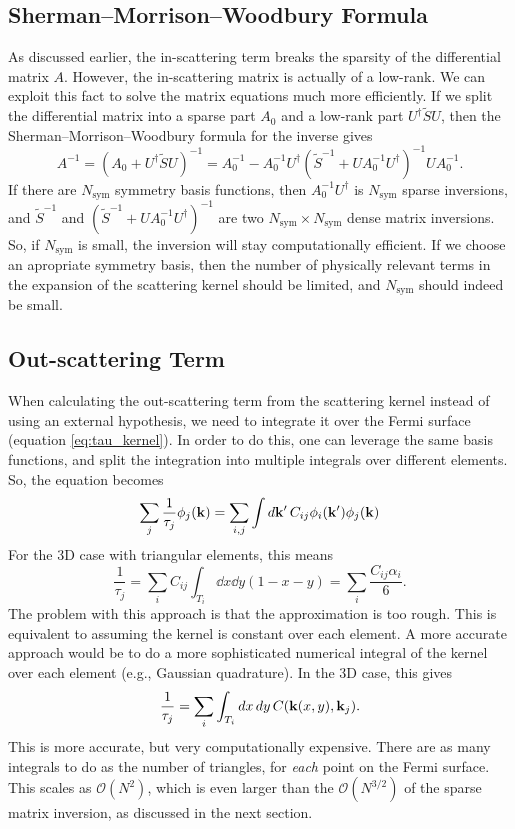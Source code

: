 \documentclass[12pt]{article}
\begin{document}
\subsection{Sherman--Morrison--Woodbury Formula}
As discussed earlier, the in-scattering term breaks the sparsity of the differential matrix $A$.
However, the in-scattering matrix is actually of a low-rank. We can exploit this fact to solve
the matrix equations much more efficiently. If we split the differential matrix into a sparse
part $A_0$ and a low-rank part $U^\dagger \tilde{S} U$, then the Sherman--Morrison--Woodbury
formula for the inverse gives
\begin{equation}
    A^{-1} = (A_0 + U^\dagger \tilde{S} U)^{-1}
    = A_0^{-1} - A_0^{-1} U^\dagger (\tilde{S}^{-1} + U A_0^{-1} U^\dagger)^{-1} U A_0^{-1}.
\end{equation}
If there are $N_{\text{sym}}$ symmetry basis functions, then $A_0^{-1} U^{\dagger}$ is
$N_{\text{sym}}$ sparse inversions, and $\tilde{S}^{-1}$ and
$(\tilde{S}^{-1} + U A_0^{-1} U^\dagger)^{-1}$ are two $N_{\text{sym}}\times N_{\text{sym}}$
dense matrix inversions. So, if $N_{\text{sym}}$ is small, the inversion will stay
computationally efficient. If we choose an apropriate symmetry basis, then the number of
physically relevant terms in the expansion of the scattering kernel should be limited, and
$N_{\text{sym}}$ should indeed be small.


\subsection{Out-scattering Term}
When calculating the out-scattering term from the scattering kernel instead of using an external
hypothesis, we need to integrate it over the Fermi surface (equation \eqref{eq:tau_kernel}).
In order to do this, one can leverage the same basis functions, and split the integration into
multiple integrals over different elements. So, the equation becomes
\begin{equation}
    \sum_j\frac{1}{\tau_j}\phi_j(\vb{k}) =
    \sum_{i,j} \int\dd{\vb{k'}} C_{ij} \phi_i(\vb{k'})\phi_j(\vb{k})
\end{equation}
For the 3D case with triangular elements, this means
\begin{equation}
    \frac{1}{\tau_j} = \sum_{i}C_{ij} \int_{T_i} \dd{x}\dd{y} (1-x-y)
    = \sum_{i}\frac{C_{ij}\alpha_i}{6}.
    \label{eq:tau_kernel_fem}
\end{equation}
The problem with this approach is that the approximation is too rough. This is equivalent to
assuming the kernel is constant over each element. A more accurate approach would be to do a more
sophisticated numerical integral of the kernel over each element (e.g., Gaussian quadrature).
In the 3D case, this gives
\begin{equation}
    \frac{1}{\tau_j} = \sum_{i}\int_{T_i} \dd{x}\dd{y} C(\vb{k}(x,y), \vb{k}_j).
\end{equation}
This is more accurate, but very computationally expensive. There are as many integrals to do
as the number of triangles, for \emph{each} point on the Fermi surface.
This scales as $\mathcal{O}(N^2)$, which is even larger than the $\mathcal{O}(N^{3/2})$ of the
sparse matrix inversion, as discussed in the next section.
\end{document}
